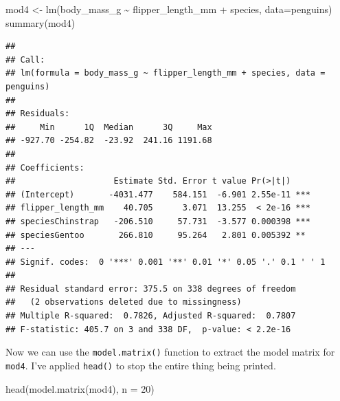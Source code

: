 \documentclass[
  openany]{book}
\newenvironment{Shaded}{\begin{snugshade}}{\end{snugshade}}
\newcommand{\AttributeTok}[1]{\textcolor[rgb]{0.77,0.63,0.00}{#1}}
\newcommand{\DecValTok}[1]{\textcolor[rgb]{0.00,0.00,0.81}{#1}}
\newcommand{\FunctionTok}[1]{\textcolor[rgb]{0.00,0.00,0.00}{#1}}
\newcommand{\NormalTok}[1]{#1}
\newcommand{\OtherTok}[1]{\textcolor[rgb]{0.56,0.35,0.01}{#1}}
\newcommand{\SpecialCharTok}[1]{\textcolor[rgb]{0.00,0.00,0.00}{#1}}
\begin{document}
\begin{Shaded}
\begin{Highlighting}[]
\NormalTok{mod4 }\OtherTok{\textless{}{-}} \FunctionTok{lm}\NormalTok{(body\_mass\_g }\SpecialCharTok{\textasciitilde{}}\NormalTok{ flipper\_length\_mm }\SpecialCharTok{+}\NormalTok{ species, }\AttributeTok{data=}\NormalTok{penguins)}
\FunctionTok{summary}\NormalTok{(mod4)}
\end{Highlighting}
\end{Shaded}

\begin{verbatim}
## 
## Call:
## lm(formula = body_mass_g ~ flipper_length_mm + species, data = penguins)
## 
## Residuals:
##     Min      1Q  Median      3Q     Max 
## -927.70 -254.82  -23.92  241.16 1191.68 
## 
## Coefficients:
##                    Estimate Std. Error t value Pr(>|t|)    
## (Intercept)       -4031.477    584.151  -6.901 2.55e-11 ***
## flipper_length_mm    40.705      3.071  13.255  < 2e-16 ***
## speciesChinstrap   -206.510     57.731  -3.577 0.000398 ***
## speciesGentoo       266.810     95.264   2.801 0.005392 ** 
## ---
## Signif. codes:  0 '***' 0.001 '**' 0.01 '*' 0.05 '.' 0.1 ' ' 1
## 
## Residual standard error: 375.5 on 338 degrees of freedom
##   (2 observations deleted due to missingness)
## Multiple R-squared:  0.7826, Adjusted R-squared:  0.7807 
## F-statistic: 405.7 on 3 and 338 DF,  p-value: < 2.2e-16
\end{verbatim}

Now we can use the \texttt{model.matrix()} function to extract the model matrix for \texttt{mod4}. I've applied \texttt{head()} to stop the entire thing being printed.

\begin{Shaded}
\begin{Highlighting}[]
\FunctionTok{head}\NormalTok{(}\FunctionTok{model.matrix}\NormalTok{(mod4), }\AttributeTok{n =} \DecValTok{20}\NormalTok{)}
\end{Highlighting}
\end{Shaded}
\end{document}
